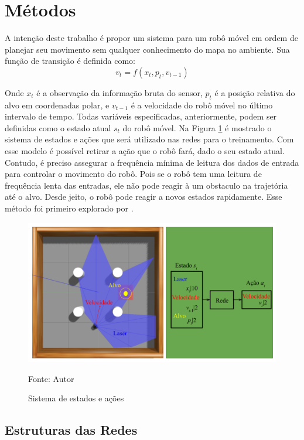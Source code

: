 \section{Métodos}

A intenção deste trabalho é propor um sistema para um robô móvel em ordem de planejar seu movimento sem qualquer conhecimento do mapa no ambiente. Sua função de transição é definida como:
\begin{equation}
    v_t = f(x_t, p_t, v_{t-1})
\end{equation}

Onde $x_t$ é a observação da informação bruta do sensor, $p_t$ é a posição relativa do alvo em coordenadas polar, e $v_{t-1}$ é a velocidade do robô móvel no último intervalo de tempo.
Todas variáveis especificadas, anteriormente, podem ser definidas como o estado atual $s_t$ do robô móvel.
Na Figura \ref{fig:state_action} é mostrado o sistema de estados e ações que será utilizado nas redes para o treinamento.
Com esse modelo é possível retirar a ação que o robô fará, dado o seu estado atual.
Contudo, é preciso assegurar a frequência mínima de leitura dos dados de entrada para controlar o movimento do robô.
Pois se o robô tem uma leitura de frequência lenta das entradas, ele não pode reagir à um obstaculo na trajetória até o alvo.
Desde jeito, o robô pode reagir a novos estados rapidamente.
Esse método foi primeiro explorado por \cite{tai2017virtual}.

\begin{figure}[H]
\caption{Sistema de estados e ações}
\centerline{\includegraphics[width=\columnwidth]{imagens/state_action.png}}
\small{Fonte: Autor}
\label{fig:state_action}
\end{figure}

\subsection{Estruturas das Redes}

